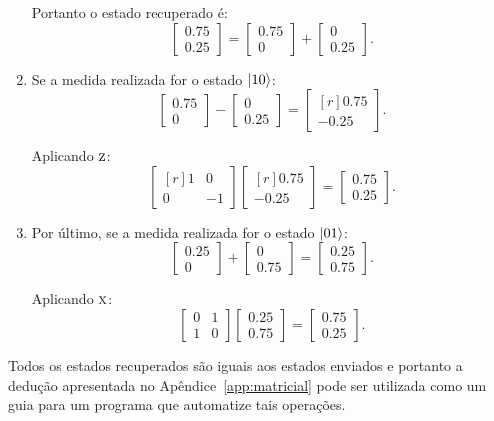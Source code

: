 \begin{enumerate}
        Portanto o estado recuperado é:
        \[
        \begin{bmatrix} \num{0.75} \\ \num{0.25} \end{bmatrix} = \begin{bmatrix} \num{0.75} \\ 0 \end{bmatrix} +  \begin{bmatrix} 0 \\ \num{0.25} \end{bmatrix}.
        \]

  \item Se a medida realizada for o estado $\ket{10}$:
        \[
        \begin{bmatrix} \num{0.75} \\ 0 \end{bmatrix} - \begin{bmatrix} 0 \\ \num{0.25} \end{bmatrix} = \begin{bmatrix*}[r] \num{0.75} \\ -\num{0.25} \end{bmatrix*}.
        \]

        Aplicando \(\operatorname{\textsc{z}}\):
        \[
        \begin{bmatrix*}[r] 1 & 0 \\ 0 & -1 \end{bmatrix*}\begin{bmatrix*}[r] \num{0.75} \\ -\num{0.25} \end{bmatrix*} = \begin{bmatrix} \num{0.75} \\ \num{0.25} \end{bmatrix}.
        \]

  \item Por último, se a medida realizada for o estado $\ket{01}$:
        \[
        \begin{bmatrix} \num{0.25} \\ 0 \end{bmatrix} +  \begin{bmatrix} 0 \\ \num{0.75} \end{bmatrix} = \begin{bmatrix} \num{0.25} \\ \num{0.75} \end{bmatrix}.
        \]

        Aplicando \(\operatorname{\textsc{x}}\):
        \[
        \begin{bmatrix} 0 & 1 \\ 1 & 0 \end{bmatrix} \begin{bmatrix} \num{0.25} \\ \num{0.75} \end{bmatrix} = \begin{bmatrix} \num{0.75} \\ \num{0.25} \end{bmatrix}.
        \]
\end{enumerate}

Todos os estados recuperados são iguais aos estados enviados e portanto a dedução apresentada no Apêndice~\ref{app:matricial} pode ser utilizada como um guia para um programa que automatize tais operações.
